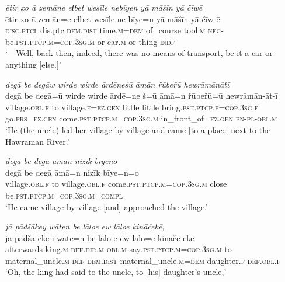 \ea \label{ZP.40}
\textit{ētir xo ā zemāne eɫbet wesīle nebīyen yā māšīn yā čīwē} \\ 
\gll ētir xo ā zemān=e eɫbet wesīle ne-bīye=n yā māšīn yā čīw-ē \\ 
 \textsc{disc.ptcl} dis.ptc \textsc{dem.dist} time\textsc{.m}\textsc{=dem} of\_course tool\textsc{.m} \textsc{neg-}be\textsc{.pst}\textsc{.ptcp}\textsc{.m}\textsc{=cop}\textsc{.3sg}\textsc{.m} or car\textsc{.m} or thing\textsc{-indf} \\ 
\glt `—Well, back then, indeed, there was no means of transport, be it a car or anything [else.]'
\z 
 
\ea \label{ZP.41}
\textit{degā be degāw wirde wirde ārdēnešū āmān řūbeřū hewrāmānātī} \\ 
\gll degā be degā=ū wirde wirde ārdē=ne š=ū āmā=n řūbeřū=ū hewrāmān-āt-ī \\ 
 village\textsc{.obl}\textsc{.f} to village\textsc{.f}\textsc{\textsc{=ez.gen}} little little bring\textsc{.pst}\textsc{.ptcp}\textsc{.f}\textsc{=cop}\textsc{.3sg}\textsc{.f} go\textsc{.prs}\textsc{\textsc{=ez.gen}} come\textsc{.pst}\textsc{.ptcp}\textsc{.m}\textsc{=cop}\textsc{.3sg}\textsc{.m} in\_front\_of\textsc{\textsc{=ez.gen}} \textsc{pn}\textsc{\textsc{-pl}}\textsc{-obl}\textsc{.m} \\ 
\glt `He (the uncle) led her village by village and came [to a place] next to the Hawraman River.'
\z 
 
\ea \label{ZP.42}
\textit{degā be degā āmān nizīk bīyeno} \\ 
\gll degā be degā āmā=n nizīk bīye=n=o \\ 
 village\textsc{.obl}\textsc{.f} to village\textsc{.obl}\textsc{.f} come\textsc{.pst}\textsc{.ptcp}\textsc{.m}\textsc{=cop}\textsc{.3sg}\textsc{.m} close be\textsc{.pst}\textsc{.ptcp}\textsc{.m}\textsc{=cop}\textsc{.3sg}\textsc{.m}\textsc{=compl} \\ 
\glt `He came village by village [and] approached the village.'
\z 
 
\ea \label{ZP.43}
\textit{jā pādšākey wāten be lāloe ew lāloe kināčekē,} \\ 
\gll jā pādšā-eke-ī wāte=n be lālo-e ew lālo=e kināčē-ekē \\ 
 afterwards king\textsc{.m}\textsc{-def}\textsc{.dir}\textsc{.m}\textsc{-obl}\textsc{.m} say\textsc{.pst}\textsc{.ptcp}\textsc{.m}\textsc{=cop}\textsc{.3sg}\textsc{.m} to maternal\_uncle\textsc{.m}\textsc{-def} \textsc{dem.dist} maternal\_uncle\textsc{.m}\textsc{=dem} daughter\textsc{.f}\textsc{-def}\textsc{.obl}\textsc{.f} \\ 
\glt `Oh, the king had said to the uncle, to [his] daughter’s uncle,'
\z 
 
